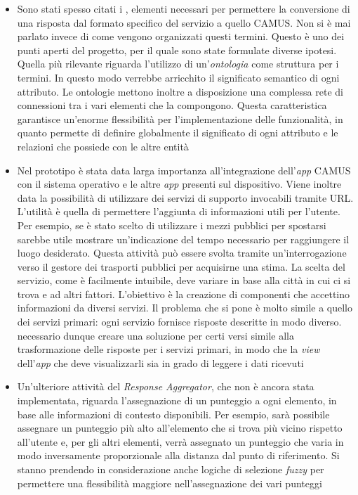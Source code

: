 \begin{itemize}
	\item
	Sono stati spesso citati i , elementi necessari per permettere la conversione di una risposta dal formato specifico del servizio a quello CAMUS. Non si è mai parlato invece di come vengono organizzati questi termini. Questo è uno dei punti aperti del progetto, per il quale sono state formulate diverse ipotesi. Quella più rilevante riguarda l'utilizzo di un'\emph{ontologia} come struttura per i termini. In questo modo verrebbe arricchito il significato semantico di ogni attributo. Le ontologie mettono inoltre a disposizione una complessa rete di connessioni tra i vari elementi che la compongono. Questa caratteristica garantisce un'enorme flessibilità per l'implementazione delle funzionalità, in quanto permette di definire globalmente il significato di ogni attributo e le relazioni che possiede con le altre entità
	\item
	Nel prototipo è stata data larga importanza all'integrazione dell'\emph{app} CAMUS con il sistema operativo e le altre \emph{app} presenti sul dispositivo. Viene inoltre data la possibilità di utilizzare dei servizi di supporto invocabili tramite URL. L'utilità è quella di permettere l'aggiunta di informazioni utili per l'utente. Per esempio, se è stato scelto di utilizzare i mezzi pubblici per spostarsi sarebbe utile mostrare un'indicazione del tempo necessario per raggiungere il luogo desiderato. Questa attività può essere svolta tramite un'interrogazione verso il gestore dei trasporti pubblici per acquisirne una stima. La scelta del servizio, come è facilmente intuibile, deve variare in base alla città in cui ci si trova e ad altri fattori. L'obiettivo è la creazione di componenti che accettino informazioni da diversi servizi. Il problema che si pone è molto simile a quello dei servizi primari: ogni servizio fornisce risposte descritte in modo diverso. \upe necessario dunque creare una soluzione per certi versi simile alla trasformazione delle risposte per i servizi primari, in modo che la \emph{view} dell'\emph{app} che deve visualizzarli sia in grado di leggere i dati ricevuti
	\item
	Un’ulteriore attività del \emph{Response Aggregator}, che non è ancora stata implementata, riguarda l’assegnazione di un punteggio a ogni elemento, in base alle informazioni di contesto disponibili. Per esempio, sarà possibile assegnare un punteggio più alto all’elemento che si trova più vicino rispetto all’utente e, per gli altri elementi, verrà assegnato un punteggio che varia in modo inversamente proporzionale alla distanza dal punto di riferimento. Si stanno prendendo in considerazione anche logiche di selezione \emph{fuzzy} per permettere una flessibilità maggiore nell’assegnazione dei vari punteggi

\end{itemize}
